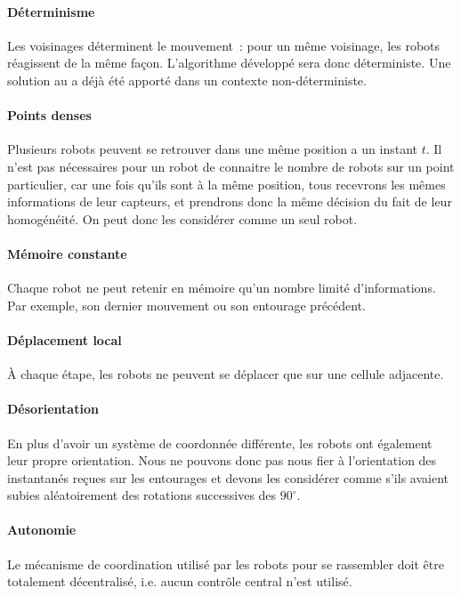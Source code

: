 \paragraph{Déterminisme} Les voisinages déterminent le mouvement~: pour un même
voisinage, les robots réagissent de la même façon. L'algorithme développé sera
donc déterministe. Une solution au \GatheringProblem a déjà été apporté dans
un contexte non-déterministe.

\paragraph{Points denses} Plusieurs robots peuvent se retrouver dans une même
position a un instant $t$. Il n'est pas nécessaires pour un robot de connaitre
le nombre de robots sur un point particulier, car une fois qu'ils sont à la
même position, tous recevrons les mêmes informations de leur capteurs, et
prendrons donc la même décision du fait de leur homogénéité. On peut donc les
considérer comme un seul robot.

\paragraph{Mémoire constante} Chaque robot ne peut retenir en mémoire qu'un
nombre limité d'informations. Par exemple, son dernier mouvement ou son
entourage précédent.

\paragraph{Déplacement local} \`A chaque étape, les robots ne peuvent se
déplacer que sur une cellule adjacente.

\paragraph{Désorientation} En plus d'avoir un système de coordonnée différente,
les robots ont également leur propre orientation. Nous ne pouvons donc pas nous
fier à l'orientation des instantanés reçues sur les entourages et devons les
considérer comme s'ils avaient subies aléatoirement des rotations successives
des $90^{\circ}$.

\paragraph{Autonomie} Le mécanisme de coordination utilisé par les robots pour
se rassembler doit être totalement décentralisé, i.e. aucun contrôle central
n'est utilisé.

